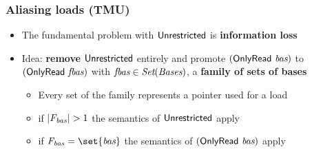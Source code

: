 

\begin{frame}[fragile]
\frametitle{Aliasing loads (TMU)}
\begin{itemize}
    \item The fundamental problem with $\mathsf{Unrestricted}$ is \textbf{information loss}
    \item Idea: \textbf{remove} $\mathsf{Unrestricted}$ entirely and promote $(\mathsf{OnlyRead} \ \textit{bas})$ to $(\mathsf{OnlyRead} \ \textit{fbas})$ with $\textit{fbas} \in \textit{Set}(\textit{Bases})$, \ie
    a \textbf{family of sets of bases}
    \begin{itemize}
        \item Every set of the family represents a pointer used for a load \\
        \item if $|\textit{F}\textsubscript{\textit{bas}}| > 1$              \qquad the semantics of $\mathsf{Unrestricted}$ apply
        \item if $\Basesfamvar = \set{\Basesvar}$ \;   the semantics of $(\mathsf{OnlyRead} \ \textit{bas})$ apply
    \end{itemize}
\end{itemize}
\end{frame}



